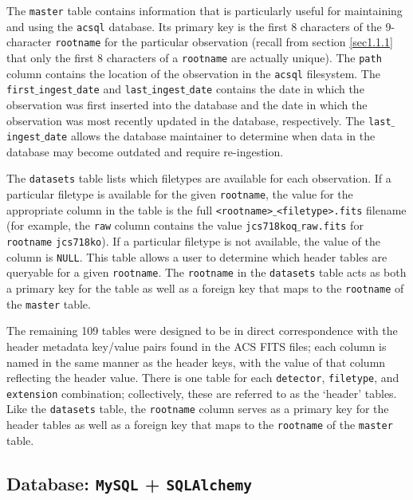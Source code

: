\documentclass[10pt,journal,compsoc]{IEEEtran}
\begin{document}
The \texttt{master} table contains information that is particularly useful for maintaining and using the \texttt{acsql} database.  Its primary key is the first 8 characters of the
9-character \texttt{rootname} for the particular observation (recall from section \ref{sec1.1.1} that only the first 8 characters of a \texttt{rootname} are actually unique).
The \texttt{path} column contains the location of the observation in the \texttt{acsql} filesystem.  The \texttt{first$\_$ingest$\_$date} and \texttt{last$\_$ingest$\_$date} contains
the date in which the observation was first inserted into the database and the date in which the observation was most recently updated in the database, respectively. The
\texttt{last$\_$ingest$\_$date} allows the database maintainer to determine when data in the database may become outdated and require re-ingestion.

The \texttt{datasets} table lists which filetypes are available for each observation.  If a particular filetype is available for the given \texttt{rootname}, the value for the
appropriate column in the table is the full \texttt{<rootname>$\_$<filetype>.fits} filename (for example, the \texttt{raw} column contains the value \texttt{jcs718koq$\_$raw.fits} for
\texttt{rootname} \texttt{jcs718ko}). If a particular filetype is not available, the value of the column is \texttt{NULL}. This table allows a user to determine which header tables are
queryable for a given \texttt{rootname}.  The \texttt{rootname} in the \texttt{datasets} table acts as both a primary key for the table as well as a foreign key that maps to the
\texttt{rootname} of the \texttt{master} table.

The remaining 109 tables were designed to be in direct correspondence with the header metadata key/value pairs found in the ACS FITS files; each column is named in the same manner as
the header keys, with the value of that column reflecting the header value. There is one table for each \texttt{detector}, \texttt{filetype}, and \texttt{extension} combination;
collectively, these are referred to as the `header' tables.  Like the \texttt{datasets} table, the \texttt{rootname} column serves as a primary key for the header tables as well
as a foreign key that maps to the \texttt{rootname} of the \texttt{master} table.


\subsection{Database: \texttt{MySQL} + \texttt{SQLAlchemy}} \label{sec3.6}
\end{document}
